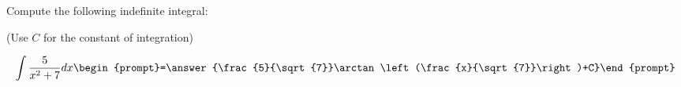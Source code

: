 \documentclass{ximera}
\author{Jim Talamo}
\begin{document}
\begin{exercise}
Compute the following indefinite integral:

\begin{prompt} (Use $C$ for the constant of integration) \end{prompt}

\[
\int \frac{5}{x^2+7} dx 
\begin{prompt}=\answer{\frac{5}{\sqrt{7}}\arctan\left(\frac{x}{\sqrt{7}}\right)+C}\end{prompt}
\]
\end{exercise}
\end{document}
